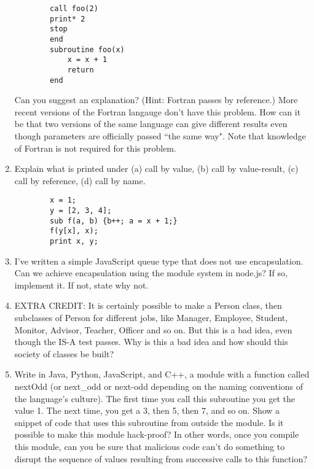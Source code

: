 \documentclass{article}
\begin{document}
\begin{enumerate}
\begin{verbatim}
	    call foo(2)
	    print* 2
	    stop
	    end
	    subroutine foo(x)
	        x = x + 1
	        return
	    end
    \end{verbatim}
	Can you suggest an explanation? (Hint: Fortran passes by reference.) More recent versions of the Fortran langauge don't have this problem. How can it be that two versions of the same language can give different results even though parameters are officially passed ``the same way". Note that knowledge of Fortran is not required for this problem.
	\setcounter{enumi}{9}
	\pagebreak
	\item Explain what is printed under (a) call by value, (b) call by value-result, (c) call by reference, (d) call by name.
	\begin{verbatim}
		x = 1;
		y = [2, 3, 4];
		sub f(a, b) {b++; a = x + 1;}
		f(y[x], x);
		print x, y;
	\end{verbatim}
	\pagebreak
	\item I've written a simple JavaScript queue type that does not use encapsulation. Can we achieve encapsulation using the module system in node.js? If so, implement it. If not, state why not.
	\pagebreak
	\item EXTRA CREDIT: It is certainly possible to make a Person class, then subclasses of Person for different jobs, like Manager, Employee, Student, Monitor, Advisor, Teacher, Officer and so on. But this is a bad idea, even though the IS-A test passes. Why is this a bad idea and how should this society of classes be built?
	\pagebreak
	\item Write in Java, Python, JavaScript, and C++, a module with a function called nextOdd (or next\_odd or next-odd depending on the naming conventions of the language's culture). The first time you call this subroutine you get the value 1. The next time, you get a 3, then 5, then 7, and so on. Show a snippet of code that uses this subroutine from outside the module. Is it possible to make this module hack-proof? In other words, once you compile this module, can you be sure that malicious code can't do something to disrupt the sequence of values resulting from successive calls to this function?
\end{enumerate}
\end{document}
